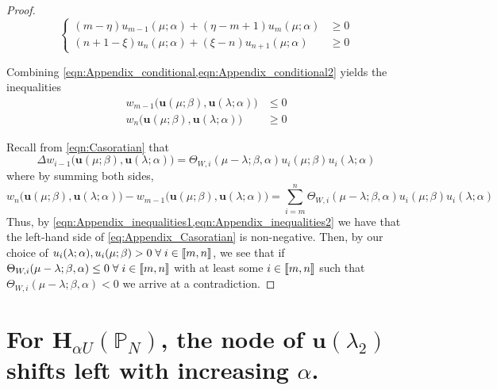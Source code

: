 \begin{proof}
      \begin{equation}\label{eqn:Appendix_conditional2}
	\begin{cases}
	      (m-\eta)u_{m-1}(\mu;\alpha) + (\eta-m+1)u_{m}(\mu;\alpha) &\geq 0 \\
	      (n+1-\xi)u_n(\mu;\alpha) + (\xi-n)u_{n+1}(\mu;\alpha) &\geq 0
	\end{cases}
      \end{equation}

      Combining \cref{eqn:Appendix_conditional,eqn:Appendix_conditional2} yields the inequalities
      \begin{align}
	      \label{eqn:Appendix_inequalities1} w_{m-1}\big(\mathbf{u}(\mu;\beta),\mathbf{u}(\lambda;\alpha)\big) &\leq 0 \\
	      \label{eqn:Appendix_inequalities2} w_{n}\big(\mathbf{u}(\mu;\beta),\mathbf{u}(\lambda;\alpha)\big) &\geq 0
      \end{align}

      Recall from \cref{eqn:Casoratian} that
      \begin{equation}
	      \Delta w_{i-1}\big(\mathbf{u}(\mu;\beta),\mathbf{u}(\lambda;\alpha)\big) = \Theta_{W,i}(\mu-\lambda;\beta,\alpha) u_{i}(\mu;\beta)u_i(\lambda;\alpha)
      \end{equation}
      where by summing both sides,
      \begin{equation}\label{eq:Appendix_Casoratian}
	      w_{n}\big(\mathbf{u}(\mu;\beta),\mathbf{u}(\lambda;\alpha)\big)-w_{m-1}\big(\mathbf{u}(\mu;\beta),\mathbf{u}(\lambda;\alpha)\big) = \sum_{i=m}^{n}\Theta_{W,i}(\mu-\lambda;\beta,\alpha) u_{i}(\mu;\beta)u_i(\lambda;\alpha)
      \end{equation}
      Thus, by \cref{eqn:Appendix_inequalities1,eqn:Appendix_inequalities2} we have that the left-hand side of \cref{eq:Appendix_Casoratian} is non-negative. Then, by our choice of $u_i(\lambda;\alpha),u_i(\mu;\beta)>0 \; \forall \; i \in \left \llbracket m , n \right \rrbracket$, we see that if $\Theta_{W,i}(\mu-\lambda;\beta,\alpha) \leq 0 \; \forall \; i \in \left \llbracket m , n \right \rrbracket$ with at least some $i\in \left \llbracket m , n \right \rrbracket$ such that $\Theta_{W,i}(\mu-\lambda;\beta,\alpha) < 0$ we arrive at a contradiction.
    \end{proof}

\chapter{For $\mathbf{H}_{\alpha U}(\mathbb{P}_N)$, the node of $\mathbf{u}(\lambda_2)$ shifts left with increasing $\alpha$.}\label{app:Sturm-Picone}

